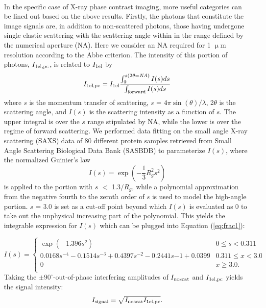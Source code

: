 \documentclass[review]{elsarticle}
\newcommand\noscat{\textup{\scriptsize{noscat}}}
\newcommand\sel{\textup{\scriptsize{1el}}}
\newcommand\signal{\textup{\scriptsize{signal}}}
\newcommand\selpc{\textup{\scriptsize{1el,pc}}}
\begin{document}
\paragraph{} In the specific case of X-ray phase contrast imaging, more useful categories can be lined out based on the above results. Firstly, the photons that constitute the image signals are, in addition to non-scattered photons, those having undergone single elastic scattering with the scattering angle within in the range defined by the numerical aperture (NA). Here we consider an NA required for 1 $\upmu$m resolution according to the Abbe criterion. The intensity of this portion of photons, $I_{\selpc}$, is related to $I_{\sel}$ by
\begin{equation}
I_{\selpc} = I_{\sel} \frac{\int_{0}^{s(2\theta=\it{NA})}I(s)ds}{\int_{\textup{forward}}I(s)ds}
\label{eq:frac1}
\end{equation}
where $s$ is the momentum transfer of scattering, $s$ = $4\pi\sin(\theta)/\lambda$, 2$\theta$ is the scattering angle, and $I(s)$ is the scattering intensity as a function of $s$. The upper integral is over the $s$ range stipulated by NA, while the lower is over the regime of forward scattering. We performed data fitting on the small angle X-ray scattering (SAXS) data of 80 different protein samples retrieved from Small Angle Scattering Biological Data Bank (SASBDB) \cite{Valentini28102014} to parameterize $I(s)$, where the normalized Guinier's law
\begin{equation}
I(s) = \exp(-\frac{1}{3}R_g^2s^2)
\label{eq:guinier}
\end{equation}
is applied to the portion with $s$ $<$ 1.3/$R_g$, while a polynomial approximation from the negative fourth to the zeroth order of $s$ is used to model the high-angle portion. $s$ = 3.0 is set as a cut-off point beyond which $I(s)$ is evaluated as 0 to take out the unphysical increasing part of the polynomial. This yields the integrable expression for $I(s)$ which can be plugged into Equation (\ref{eq:frac1}):

\begin{equation}
I(s) = 
\begin{cases} 
      \exp(-1.396s^2) & 0 \leq s < 0.311 \\
      0.0168s^{-4} - 0.1514s^{-3} + 0.4397s^{-2} - 0.2441s{-1} + 0.0399 & 0.311 \leq x < 3.0 \\
      0 & x \geq 3.0. \\
   \end{cases}
\label{eq:fit}
\end{equation}
Taking the $\pm90^{\circ}$-out-of-phase interfering amplitudes of $I_{\noscat}$ and $I_{\selpc}$ yields the signal intensity:
\begin{equation}
I_{\signal} = \sqrt{I_{\noscat}I_{\selpc}}.
\end{equation}
\end{document}
